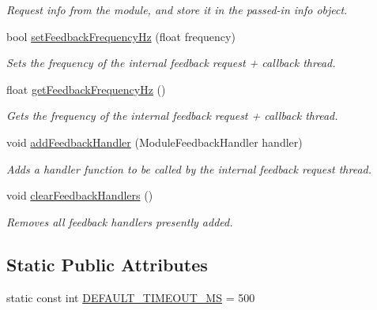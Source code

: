 \begin{DoxyCompactItemize}
\begin{DoxyCompactList}\small\item\em Request info from the module, and store it in the passed-\/in info object. \end{DoxyCompactList}\item 
bool \hyperlink{classhebi_1_1Module_a2d37eac7776c910ca5d5de47cadec3e3}{set\+Feedback\+Frequency\+Hz} (float frequency)
\begin{DoxyCompactList}\small\item\em Sets the frequency of the internal feedback request + callback thread. \end{DoxyCompactList}\item 
float \hyperlink{classhebi_1_1Module_a7c15d50b692a5f92ec41e7b88bab8680}{get\+Feedback\+Frequency\+Hz} ()
\begin{DoxyCompactList}\small\item\em Gets the frequency of the internal feedback request + callback thread. \end{DoxyCompactList}\item 
void \hyperlink{classhebi_1_1Module_aa2d0cb41bbcf3ffd2ea1d86ef98e10aa}{add\+Feedback\+Handler} (Module\+Feedback\+Handler handler)\hypertarget{classhebi_1_1Module_aa2d0cb41bbcf3ffd2ea1d86ef98e10aa}{}\label{classhebi_1_1Module_aa2d0cb41bbcf3ffd2ea1d86ef98e10aa}

\begin{DoxyCompactList}\small\item\em Adds a handler function to be called by the internal feedback request thread. \end{DoxyCompactList}\item 
void \hyperlink{classhebi_1_1Module_a4eebac29798f983c8be20498c03b645a}{clear\+Feedback\+Handlers} ()\hypertarget{classhebi_1_1Module_a4eebac29798f983c8be20498c03b645a}{}\label{classhebi_1_1Module_a4eebac29798f983c8be20498c03b645a}

\begin{DoxyCompactList}\small\item\em Removes all feedback handlers presently added. \end{DoxyCompactList}\end{DoxyCompactItemize}
\subsection*{Static Public Attributes}
\begin{DoxyCompactItemize}
\item 
static const int \hyperlink{classhebi_1_1Module_afba0d28ff83c8ddabd8f6490e412c821}{D\+E\+F\+A\+U\+L\+T\+\_\+\+T\+I\+M\+E\+O\+U\+T\+\_\+\+MS} = 500
\end{DoxyCompactItemize}
